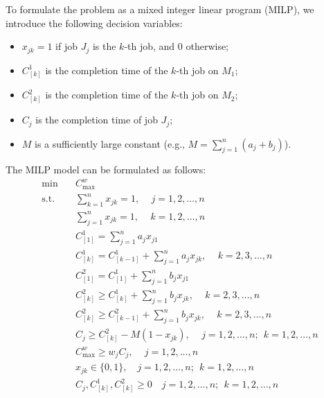\documentclass[12pt]{article} \textheight=24.5cm \textwidth=16.5cm \parskip = 0.165cm
\begin{document}
\begin{sloppypar}
        To formulate the problem as a mixed integer linear program (MILP), we introduce the following decision variables:
        \begin{itemize}
            \item $x_{jk} = 1$ if job $J_j$ is the $k$-th job, and $0$ otherwise;
            
            \item $C_{[k]}^1$ is the completion time of the $k$-th job on $M_1$;
            
            \item $C_{[k]}^2$ is the completion time of the $k$-th job on $M_2$;
            
            \item $C_j$ is the completion time of job $J_j$;
            
            \item $M$ is a sufficiently large constant (e.g., $M=\sum_{j=1}^{n}(a_j + b_j)$).
        \end{itemize}
        
        The MILP model can be formulated as follows:
        \begin{align}
            \min \quad & C_{\max}^w \label{milp:obj} \\
            \text{s.t.} \quad & \sum_{k=1}^{n} x_{jk} = 1, \quad \, j = 1, 2,\dots, n \label{milp:assign1} \\
            & \sum_{j=1}^{n} x_{jk} = 1, \quad \, k = 1, 2, \ldots,n \label{milp:assign2} \\
            & C_{[1]}^1 = \sum_{j=1}^{n} a_j x_{j1} \label{milp:m1_start} \\
            & C_{[k]}^1 = C_{[k-1]}^1 + \sum_{j=1}^{n} a_j x_{jk}, \quad \, k = 2, 3, \ldots, n \label{milp:m1_rec} \\
            & C_{[1]}^2 = C_{[1]}^1 + \sum_{j=1}^{n} b_j x_{j1} \label{milp:m2_start} \\
            & C_{[k]}^2 \geq C_{[k]}^1 + \sum_{j=1}^{n} b_j x_{jk}, \quad \, k = 2, 3, \ldots, n \label{milp:m2_a} \\
            & C_{[k]}^2 \geq C_{[k-1]}^2 + \sum_{j=1}^{n} b_j x_{jk}, \quad \, k = 2, 3, \ldots, n \label{milp:m2_b} \\
            & C_j \geq C_{[k]}^2 - M(1 - x_{jk}), \quad \, j = 1, 2, \ldots, n; ~~ k = 1, 2, \ldots, n \label{milp:link} \\
            & C_{\max}^w \geq w_j C_j, \quad \, j = 1, 2, \ldots,n \label{milp:wcmax} \\
            & x_{jk} \in \{0, 1\},\quad j=1, 2, \ldots, n; ~~ k=1, 2, \ldots, n \label{milp:x}\\
            & C_j, C_{[k]}^1, C_{[k]}^2 \geq 0 \quad j=1, 2, \ldots, n; ~~ k=1, 2, \ldots, n \label{milp:dom}
        \end{align}
        

\end{sloppypar}
\end{document}
